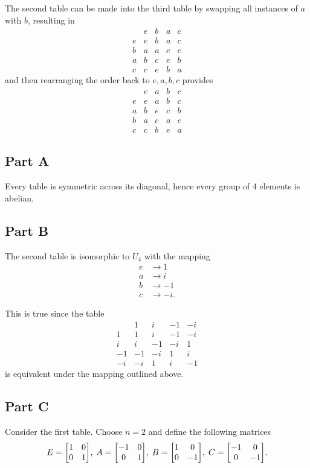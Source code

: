 \documentclass[12pt]{extarticle}
\begin{document}
The second table can be made into the third table by swapping all instances of $a$ with $b$, resulting in
\[
	\begin{array}{c|c|c|c|c}
			& e & b & a & c \\\hline
		e & e & b & a & c \\\hline
		b & a & a & c & e \\\hline
		a & b & c & e & b \\\hline
		c & c & e & b & a 
	\end{array}
\]
and then rearranging the order back to $e,a,b,c$ provides
\[
	\begin{array}{c|c|c|c|c}
			& e & a & b & c \\\hline
		e & e & a & b & c \\\hline
		a & b & e & c & b \\\hline
		b & a & c & a & e \\\hline
		c & c & b & e & a 
	\end{array}
\]

\subsection*{Part A}
Every table is symmetric across its diagonal, hence every group of $4$ elements is abelian.

\subsection*{Part B}
The second table is isomorphic to $U_4$ with the mapping
\begin{align*}
	e &\to 1 \\
	a &\to i \\
	b &\to -1 \\
	c &\to -i
.\end{align*}

This is true since the table
\[
	\renewcommand{\arraystretch}{1.5}
	\begin{array}{c|c|c|c|c}
			& 1 & i & -1 & -i  \\\hline
		1 & 1 & i & -1 & -i  \\\hline
		i & i & -1 & -i & 1  \\\hline
		-1 & -1 & -i & 1 & i \\\hline
		-i & -i & 1 & i & -1 
	\end{array}
\]
is equivalent under the mapping outlined above.

\subsection*{Part C}
Consider the first table. Choose $n = 2$ and define the following matrices
\[
	E = \mqty[1 & 0 \\ 0 & 1],\; A = \mqty[-1 & 0 \\ 0 & 1 ],\; B = \mqty[1 & 0 \\ 0 & -1],\; C = \mqty[-1 & 0 \\ 0 & -1]
.\]
\end{document}
